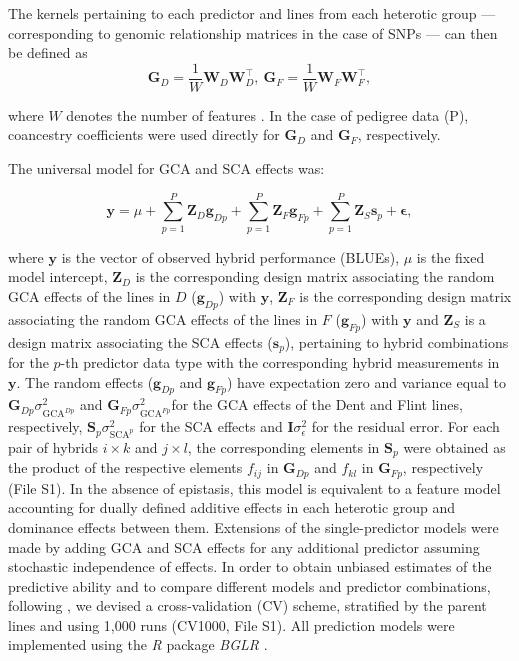 \documentclass[12pt,titlepage]{article}
\begin{document}
The kernels pertaining to each predictor and lines from each heterotic group
--- corresponding to genomic relationship matrices in the case of SNPs --- can 
then be defined as
\begin{equation} \label{eq:GenomicRelationship}
  \mathbf{G}_{D} = \frac{1}{W} \mathbf{W}_{D} \mathbf{W}_{D}^{\top}, \
  \mathbf{G}_{F} = \frac{1}{W} \mathbf{W}_{F} \mathbf{W}_{F}^{\top},
\end{equation}

where $W$ denotes the number of features \cite{VanRaden2008}.
In the case of pedigree data (P), coancestry coefficients were used directly
for $\mathbf{G}_{D}$ and $\mathbf{G}_{F}$, respectively.


The universal model for GCA and SCA effects was:

\begin{equation} \label{eq:HypredDominance}
  \mathbf{y} = \mu + 
  \sum_{p=1}^{P} \mathbf{Z}_{D} \mathbf{g}_{Dp} +
  \sum_{p=1}^{P} \mathbf{Z}_{F} \mathbf{g}_{Fp} +
  \sum_{p=1}^{P} \mathbf{Z}_{S} \mathbf{s}_{p} +
  \mathbf{\epsilon},
\end{equation}


where $\mathbf{y}$ is the vector of observed hybrid performance (BLUEs), $\mu$ 
is the fixed model intercept, $\mathbf{Z}_{D}$ is the
corresponding design matrix associating the random GCA effects of the lines in
$D$ ($\mathbf{g}_{Dp}$) with $\mathbf{y}$, $\mathbf{Z}_{F}$ is the 
corresponding design matrix associating the random GCA effects of the lines in 
$F$ ($\mathbf{g}_{Fp}$) with $\mathbf{y}$ and $\mathbf{Z}_{S}$ is a design 
matrix associating the SCA effects ($\mathbf{s}_{p}$), pertaining to hybrid 
combinations for the $p$-th predictor data type with the corresponding hybrid 
measurements in $\mathbf{y}$.
The random effects ($\mathbf{g}_{Dp}$ and $\mathbf{g}_{Fp}$) have expectation 
zero and variance equal to $\mathbf{G}_{Dp} \sigma^{2}_{\text{GCA}^{Dp}}$ and 
$\mathbf{G}_{Fp} \sigma^{2}_{\text{GCA}^{Fp}}$for the GCA effects of the Dent
and Flint lines, respectively,
$\mathbf{S}_{p} \sigma^{2}_{\text{SCA}^{p}}$ for the SCA effects and
$\mathbf{I} \sigma^2_{\epsilon}$ for the residual error.
For each pair of hybrids $i \times k$ and $j \times l$, the corresponding
elements in $\mathbf{S}_{p}$ were obtained as the product of the respective
elements $f_{ij}$ in $\mathbf{G}_{Dp}$ and $f_{kl}$ in $\mathbf{G}_{Fp}$,
respectively \cite{Schnell1965,Bernardo1996,Massman2013} (File S1).
In the absence of epistasis, this model is equivalent to a feature model
accounting for dually defined additive effects in each heterotic group and
dominance effects between them.
Extensions of the single-predictor models were made by adding GCA and SCA
effects for any additional predictor assuming stochastic independence of
effects.
In order to obtain unbiased estimates of the predictive ability and to compare
different models and predictor combinations, following \citeN{Technow2014}, we 
devised a cross-validation (CV) scheme, stratified by the parent lines and using 
1,000 runs (CV1000, File S1). All prediction models were implemented using the 
\emph{R} package \emph{BGLR} \cite{Perez2014}.
\end{document}
